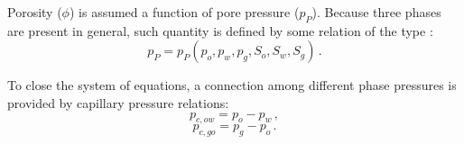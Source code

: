 \documentclass[authoryear,preprint,review,11pt]{elsarticle}
\begin{document}
Porosity ($\phi$) is assumed a function of pore pressure ($p_P$). Because three phases are present in general, such quantity is defined by some relation of the type \citep{kim2011rigorous}:
\begin{equation}
p_P=p_P\left(p_o,p_w,p_g,S_o,S_w,S_g\right) \, .
\end{equation}

To close the system of equations, a connection among different phase pressures is provided by capillary pressure relations:
\begin{equation}\label{eq: capillary_ow}
p_{c,ow}=p_o-p_w \, ,
\end{equation}
\begin{equation}\label{eq: capillary_og}
p_{c,go}=p_g-p_o \, .
\end{equation}



%
%
%
\end{document}
